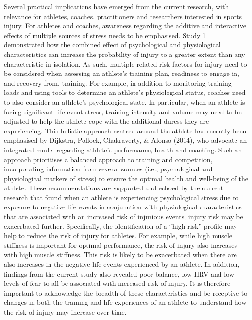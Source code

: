 \documentclass[
  english,
  man,floatsintext]{apa6}
\begin{document}
Several practical implications have emerged from the current research, with relevance for athletes, coaches, practitioners and researchers interested in sports injury.
For athletes and coaches, awareness regarding the additive and interactive effects of multiple sources of stress needs to be emphasised.
Study 1 demonstrated how the combined effect of psychological and physiological characteristics can increase the probability of injury to a greater extent than any characteristic in isolation.
As such, multiple related risk factors for injury need to be considered when assessing an athlete's training plan, readiness to engage in, and recovery from, training.
For example, in addition to monitoring training loads and using tools to determine an athlete's physiological status, coaches need to also consider an athlete's psychological state.
In particular, when an athlete is facing significant life event stress, training intensity and volume may need to be adjusted to help the athlete cope with the additional duress they are experiencing.
This holistic approach centred around the athlete has recently been emphasised by Dijkstra, Pollock, Chakraverty, \& Alonso (2014), who advocate an integrated model regarding athlete's performance, health and coaching.
Such an approach prioritises a balanced approach to training and competition, incorporating information from several sources (i.e., psychological and physiological markers of stress) to ensure the optimal health and well-being of the athlete.
These recommendations are supported and echoed by the current research that found when an athlete is experiencing psychological stress due to exposure to negative life events in conjunction with physiological characteristics that are associated with an increased risk of injurious events, injury risk may be exacerbated further.
Specifically, the identification of a \enquote{high risk} profile may help to reduce the risk of injury for athletes.
For example, while high muscle stiffness is important for optimal performance, the risk of injury also increases with high muscle stiffness.
This risk is likely to be exacerbated when there are also increases in the negative life events experienced by an athlete.
In addition, findings from the current study also revealed poor balance, low HRV and low levels of fear to all be associated with increased risk of injury.
It is therefore important to acknowledge the breadth of these characteristics and be receptive to changes in both the training and life experiences of an athlete to understand how the risk of injury may increase over time.
\end{document}

